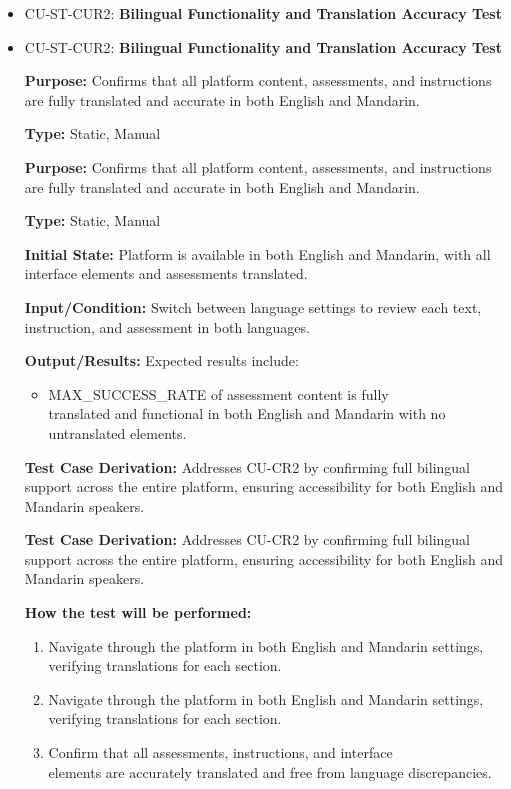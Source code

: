 \documentclass[12pt, titlepage]{article}
\begin{document}
\begin{itemize}
  \item CU-ST-CUR2: \textbf{Bilingual Functionality and Translation Accuracy Test}
  \item CU-ST-CUR2: \textbf{Bilingual Functionality and Translation Accuracy Test}
  \begin{mdframed}[linewidth=0.5mm] 
    \textbf{Purpose:} Confirms that all platform content, assessments, and instructions are fully translated and accurate in both English and Mandarin. \par
    \textbf{Type:} Static, Manual \par 
    \textbf{Purpose:} Confirms that all platform content, assessments, and instructions are fully translated and accurate in both English and Mandarin. \par
    \textbf{Type:} Static, Manual \par 
    \textbf{Initial State:} Platform is available in both English and Mandarin, with all interface elements and assessments translated. \par 
    \textbf{Input/Condition:} Switch between language settings to review each text,\\
    instruction, and assessment in both languages. \par 
    \textbf{Output/Results:} Expected results include: 
    \begin{itemize} 
      \item MAX\_SUCCESS\_RATE of assessment content is fully \\translated and functional in both English and Mandarin with no \\untranslated elements. 
    \end{itemize} \par 
    \textbf{Test Case Derivation:} Addresses CU-CR2 by confirming full bilingual support across the entire platform, ensuring accessibility for both English and Mandarin speakers. \par 
    \textbf{Test Case Derivation:} Addresses CU-CR2 by confirming full bilingual support across the entire platform, ensuring accessibility for both English and Mandarin speakers. \par 
    \textbf{How the test will be performed:} 
    \begin{enumerate}[noitemsep] 
      \item Navigate through the platform in both English and Mandarin settings, \\ verifying translations for each section. 
      \item Navigate through the platform in both English and Mandarin settings, \\ verifying translations for each section. 
      \item Confirm that all assessments, instructions, and interface \\elements are accurately translated and free from language discrepancies. 
    \end{enumerate} 
  \end{mdframed} 


\end{itemize}
\end{document}
